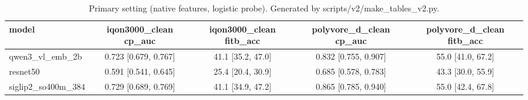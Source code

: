 \begin{table}[t]\centering\small
\caption{Primary setting (native features, logistic probe). Generated by scripts/v2/make_tables_v2.py.}\label{tab:v2-main}
\begin{tabular}{lcccc}\toprule
model & iqon3000\_clean cp\_auc & iqon3000\_clean fitb\_acc & polyvore\_d\_clean cp\_auc & polyvore\_d\_clean fitb\_acc \\\midrule
qwen3\_vl\_emb\_2b & 0.723 [0.679, 0.767] & 41.1 [35.2, 47.0] & 0.832 [0.755, 0.907] & 55.0 [41.0, 67.2] \\
resnet50 & 0.591 [0.541, 0.645] & 25.4 [20.4, 30.9] & 0.685 [0.578, 0.783] & 43.3 [30.0, 55.9] \\
siglip2\_so400m\_384 & 0.729 [0.689, 0.769] & 41.1 [34.9, 47.2] & 0.865 [0.785, 0.940] & 55.0 [42.4, 67.8] \\
\bottomrule\end{tabular}
\end{table}
